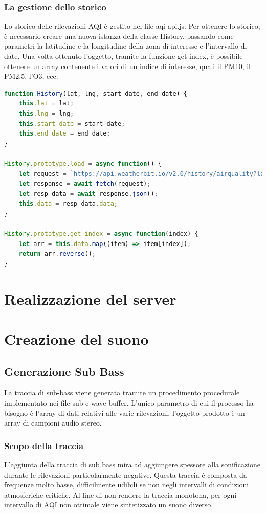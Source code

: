 \subsubsection{La gestione dello storico}
Lo storico delle rilevazioni AQI è gestito nel file aqi api.js.
Per ottenere lo storico, è necessario creare una nuova istanza della classe History, passando come parametri la latitudine e la longitudine della zona di interesse e l'intervallo di date.
Una volta ottenuto l'oggetto, tramite la funzione get index, è possibile ottenere un array contenente i valori di un indice di interesse, quali il PM10, il PM2.5, l'O3, ecc.
\begin{lstlisting}[language=Javascript]
function History(lat, lng, start_date, end_date) {
    this.lat = lat;
    this.lng = lng;
    this.start_date = start_date;
    this.end_date = end_date;
}

History.prototype.load = async function() {
    let request = `https://api.weatherbit.io/v2.0/history/airquality?lat=${this.lat}&lon=${this.lng}&start_date=${this.start_date}&end_date=${this.end_date}&tz=local&key=${weatherbit_key}`;
    let response = await fetch(request);
    let resp_data = await response.json();
    this.data = resp_data.data;
}

History.prototype.get_index = async function(index) {
    let arr = this.data.map((item) => item[index]);
    return arr.reverse();
}
\end{lstlisting}




\section{Realizzazione del server}



\section{Creazione del suono}
\subsection{Generazione Sub Bass} 
La traccia di sub-bass viene generata tramite un procedimento procedurale implementato nei file sub e wave buffer.
L'unico parametro di cui il processo ha bisogno è l'array di dati relativi alle varie rilevazioni, l'oggetto prodotto è un array di campioni audio stereo.
\subsubsection{Scopo della traccia}
L'aggiunta della traccia di sub bass mira ad aggiungere spessore alla sonificazione durante le rilevazioni particolarmente negative.
Questa traccia è composta da frequenze molto basse, difficilmente udibili se non negli intervalli di condizioni atmosferiche critiche.
Al fine di non rendere la traccia monotona, per ogni intervallo di AQI non ottimale viene sintetizzato un suono diverso.
